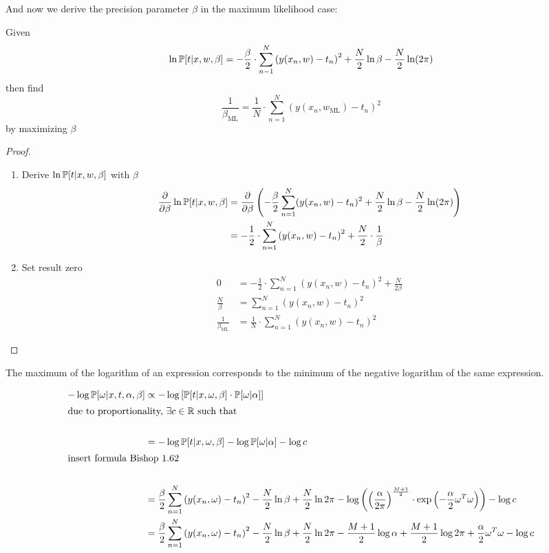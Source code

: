 And now we derive the precision parameter $\beta$ in the maximum likelihood case:

\begin{theorem}
  Given
  \[ \ln{\mathbb P[t | x, w, \beta]} = -\frac{\beta}{2} \cdot \sum_{n-1}^N \left(y(x_n,w) - t_n\right)^2 + \frac{N}2 \ln{\beta} - \frac{N}{2} \ln(2\pi) \]
  then find
  \[ \frac{1}{\beta_{\text{ML}}} = \frac{1}{N} \cdot \sum_{n=1}^N (y(x_n, w_{\text{ML}}) - t_n)^2 \] by maximizing $\beta$
\end{theorem}

\begin{proof}
\begin{enumerate}
  \item Derive $\ln{\mathbb P[t | x,w,\beta]}$ with $\beta$
    \begin{align*}
      \frac{\partial}{\partial \beta} \ln{\mathbb P[t | x,w,\beta]}
      &= \frac{\partial}{\partial \beta} \left(-\frac{\beta}{2} \sum_{n=1}^N (y(x_n,w) - t_n)^2 + \frac{N}{2} \ln\beta - \frac{N}{2} \ln(2\pi)\right) \\
      &= -\frac12 \cdot \sum_{n=1}^N \left(y(x_n,w) - t_n\right)^2 + \frac{N}{2} \cdot \frac1\beta
    \end{align*}
  \item Set result zero
    \begin{align*}
      0 &= -\frac{1}{2} \cdot \sum_{n=1}^N \left(y(x_n,w) - t_n\right)^2 + \frac{N}{2\beta} \\
      \frac{N}{\beta} &= \sum_{n=1}^N \left(y(x_n,w) - t_n\right)^2 \\
      \frac{1}{\beta_{\text{ML}}} &= \frac{1}{N} \cdot \sum_{n=1}^N (y(x_n,w) - t_n)^2
    \end{align*}
\end{enumerate}
\end{proof}







The maximum of the logarithm of an expression corresponds to the minimum of the negative logarithm of the same expression. 

\begin{align}
  -\log{\mathbb P[\omega|x,t,\alpha,\beta]}
    &\propto -\log\left[\mathbb P[t|x,\omega,\beta] \cdot \mathbb P[\omega|\alpha]\right] \\
\intertext{due to proportionality, $\exists c \in \mathbb R$ such that} \\
    &= -\log{\mathbb P[t|x,\omega,\beta]} - \log\mathbb P[\omega|\alpha] - \log{c} \\
\intertext{insert formula Bishop 1.62} \\
    &= \frac\beta2 \sum_{n=1}^N \left(y(x_n,\omega)-t_n\right)^2 - \frac{N}{2} \ln\beta + \frac{N}{2} \ln{2\pi} - \log\left(\left(\frac{\alpha}{2\pi}\right)^{\frac{M+1}{2}} \cdot \exp\left(-\frac{\alpha}{2} \omega^T \omega\right)\right) - \log{c} \\
    &= \frac\beta2 \sum_{n=1}^N \left(y(x_n,\omega)-t_n\right)^2 - \frac{N}{2} \ln\beta + \frac{N}{2} \ln{2\pi} - \frac{M+1}{2} \log\alpha + \frac{M+1}{2} \log{2\pi} + \frac{\alpha}{2} \omega^T \omega - \log{c}
\end{align}

